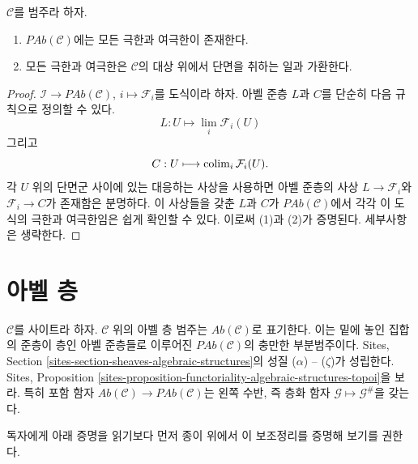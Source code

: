 \begin{lemma}
\label{lemma-limits-colimits-abelian-presheaves}
$\mathcal{C}$를 범주라 하자.
\begin{enumerate}
\item $\textit{PAb}(\mathcal{C})$에는 모든 극한과 여극한이 존재한다.
\item 모든 극한과 여극한은 $\mathcal{C}$의 대상 위에서 단면을 취하는 일과
가환한다.
\end{enumerate}
\end{lemma}

\begin{proof}
$\mathcal{I} \to \textit{PAb}(\mathcal{C})$, $i \mapsto \mathcal{F}_i$를
도식이라 하자. 아벨 준층 $L$과 $C$를 단순히 다음 규칙으로 정의할 수 있다.
$$
L : U \longmapsto \lim_i \mathcal{F}_i(U)
$$
그리고
$$
C : U \longmapsto \mathop{\mathrm{colim}}\nolimits_i \mathcal{F}_i(U).
$$
각 $U$ 위의 단면군 사이에 있는 대응하는 사상을 사용하면 아벨 준층의 사상
$L \to \mathcal{F}_i$와 $\mathcal{F}_i \to C$가 존재함은 분명하다.
이 사상들을 갖춘 $L$과 $C$가 $\textit{PAb}(\mathcal{C})$에서 각각 이 도식의
극한과 여극한임은 쉽게 확인할 수 있다. 이로써 (1)과 (2)가 증명된다.
세부사항은 생략한다.
\end{proof}


\section{아벨 층}
\label{section-abelian-sheaves}

\noindent
$\mathcal{C}$를 사이트라 하자. $\mathcal{C}$ 위의 아벨 층 범주는
$\textit{Ab}(\mathcal{C})$로 표기한다. 이는 밑에 놓인 집합의 준층이 층인
아벨 준층들로 이루어진 $\textit{PAb}(\mathcal{C})$의 충만한 부분범주이다.
Sites, Section \ref{sites-section-sheaves-algebraic-structures}의 성질
($\alpha$) -- ($\zeta$)가 성립한다. Sites, Proposition
\ref{sites-proposition-functoriality-algebraic-structures-topoi}을 보라.
특히 포함 함자
$\textit{Ab}(\mathcal{C}) \to \textit{PAb}(\mathcal{C})$는 왼쪽 수반,
즉 층화 함자 $\mathcal{G} \mapsto \mathcal{G}^\#$을 갖는다.

\medskip\noindent
독자에게 아래 증명을 읽기보다 먼저 종이 위에서 이 보조정리를 증명해
보기를 권한다.

